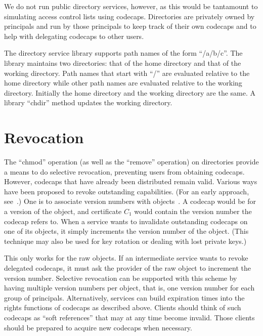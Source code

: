 \documentclass[10pt, conference, compsocconf]{IEEEtran}
\begin{document}
We do not run public directory services, however, as this would
be tantamount to simulating access control lists using codecaps.
Directories are privately owned by principals and run by those
principals to keep track of their own codecaps and to help
with delegating codecaps to other users.

\begin{comment}
For ease of use, it may in fact be convenient to structure the
directory graph itself into a tree, much like a Unix directory
graph.  Each directory would have a ``..'' row containing the
codecap of the parent directory.  Directories would have ``owner'',
``group'', and ``other'' columns.
\end{comment}

The directory service library supports path names of the form
``/a/b/c''.  The library maintains two directories: that of the
home directory and that of the working directory.  Path names that
start with ``/'' are evaluated relative to the home directory while
other path names are evaluated relative to the working directory.
Initially the home directory and the working directory are the same.
A library ``chdir'' method updates the working directory.



\section{Revocation}

The ``chmod'' operation (as well as the ``remove'' operation) on
directories provide a means to do selective revocation, preventing users
from obtaining codecaps.  However, codecaps
that have already been distributed remain valid.
Various ways have been proposed to revoke outstanding capabilities.
(For an early approach, see~\cite{Red74}.)
One is to associate version numbers with objects~\cite{GGT97}.
A codecap would be for a version of the object,
and certificate $C_1$ would contain the version number the codecap refers
to.
When a service wants to invalidate outstanding codecaps on one of
its objects, it simply increments the version number of the object.
(This technique may also be used for key rotation or dealing with
lost private keys.)

This only works for the raw objects.  If an intermediate service
wants to revoke delegated codecaps, it must ask the provider of
the raw object to increment the version number.  Selective revocation
can be supported with this scheme by having multiple version numbers
per object, that is, one version number for each group of principals.
Alternatively, services can build expiration times into the
rights functions of codecaps as described above.  Clients should
think of such codecaps as ``soft references'' that may at any time
become invalid.
Those clients should be prepared to acquire new codecaps when
necessary.
\end{document}
